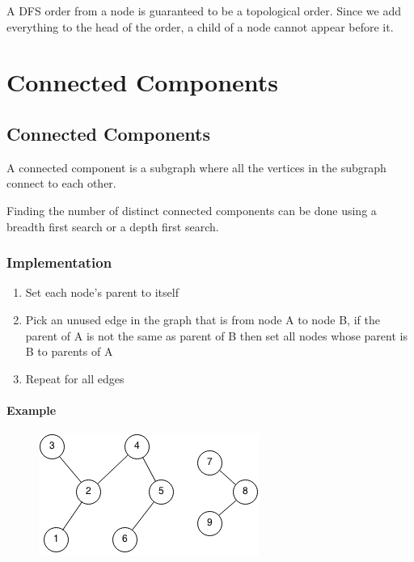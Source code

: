 \documentclass[11pt,oneside]{book}
\makeatletter
\def\maxwidth#1{\ifdim\Gin@nat@width>#1 #1\else\Gin@nat@width\fi}
\makeatother
\begin{document}
A DFS order from a node is guaranteed to be a topological order. Since we add everything to the head of the order, a child of a node cannot appear before it.

    \chapter{ Connected Components }
        \section{ Connected Components }
        

A connected component is a subgraph where all the vertices in the subgraph connect to each other.

Finding the number of distinct connected components can be done using a breadth first search or a depth first search.

\subsection{Implementation}

\begin{enumerate}
\item Set each node's parent to itself
\item Pick an unused edge in the graph that is from node A to node B, if the parent of A is not the same as parent of B then set all nodes whose parent is B to parents of A
\item Repeat for all edges
\end{enumerate}

\subsubsection{Example}

\vspace{5px}\begin{figure}[H]\centering
        \includegraphics[width=0.66\maxwidth{\textwidth}]{connectedcomponents.png}
        \end{figure}
\end{document}
